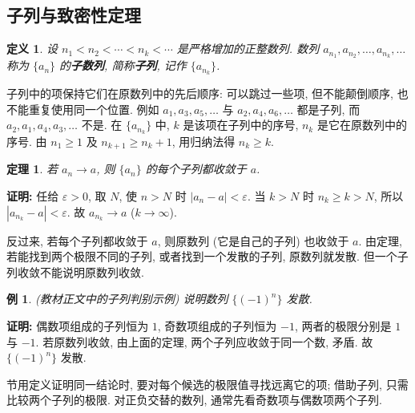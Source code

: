 \documentclass[UTF8,openany]{ctexbook}
\theoremstyle{chinesetextbook}
\newtheorem{definition}{定义}[section]
\newtheorem{example}{例}[section]
\newtheorem{theorem}{定理}[section]
\newenvironment{cnproof}{\par\indent\textbf{证明:} \ignorespaces}{\par}
\begin{document}
\subsection{子列与致密性定理}
\begin{definition}
设 $n_1<n_2<\cdots<n_k<\cdots$ 是严格增加的正整数列. 数列 $a_{n_1},a_{n_2},\ldots,a_{n_k},\ldots$ 称为 $\{a_n\}$ 的\textbf{子数列}, 简称\textbf{子列}, 记作 $\{a_{n_k}\}$.
\end{definition}
子列中的项保持它们在原数列中的先后顺序: 可以跳过一些项, 但不能颠倒顺序, 也不能重复使用同一个位置. 例如 $a_1,a_3,a_5,\ldots$ 与 $a_2,a_4,a_6,\ldots$ 都是子列, 而 $a_2,a_1,a_4,a_3,\ldots$ 不是. 在 $\{a_{n_k}\}$ 中, $k$ 是该项在子列中的序号, $n_k$ 是它在原数列中的序号. 由 $n_1\ge1$ 及 $n_{k+1}\ge n_k+1$, 用归纳法得 $n_k\ge k$.
\begin{theorem}
若 $a_n\to a$, 则 $\{a_n\}$ 的每个子列都收敛于 $a$.
\end{theorem}
\begin{cnproof}
任给 $\varepsilon>0$, 取 $N$, 使 $n>N$ 时 $|a_n-a|<\varepsilon$. 当 $k>N$ 时 $n_k\ge k>N$, 所以 $|a_{n_k}-a|<\varepsilon$. 故 $a_{n_k}\to a$ ($k\to\infty$).
\end{cnproof}
反过来, 若每个子列都收敛于 $a$, 则原数列 (它是自己的子列) 也收敛于 $a$. 由定理, 若能找到两个极限不同的子列, 或者找到一个发散的子列, 原数列就发散. 但一个子列收敛不能说明原数列收敛.
\begin{example}\label{ex:14-sub}
\textnormal{(教材正文中的子列判别示例)} 说明数列 $\{(-1)^n\}$ 发散.
\end{example}
\begin{cnproof}
偶数项组成的子列恒为 $1$, 奇数项组成的子列恒为 $-1$, 两者的极限分别是 $1$ 与 $-1$. 若原数列收敛, 由上面的定理, 两个子列应收敛于同一个数, 矛盾. 故 $\{(-1)^n\}$ 发散.
\end{cnproof}
1.2 节用定义证明同一结论时, 要对每个候选的极限值寻找远离它的项; 借助子列, 只需比较两个子列的极限. 对正负交替的数列, 通常先看奇数项与偶数项两个子列.
\end{document}
